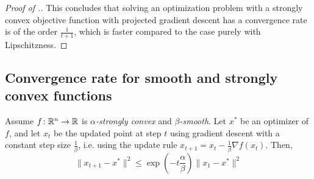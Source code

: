 \begin{proof}[Proof of .]
This concludes that solving an optimization problem with a strongly convex
objective function with projected gradient descent has a convergence rate is of
the order $\frac{1}{t+1}$, which is faster compared to the case purely with
Lipschitzness.
\end{proof}


\subsection{Convergence rate for smooth and strongly convex functions}

\begin{theorem} 
Assume $f\colon\mathbb{R}^n\to\mathbb{R}$ is \emph{$\alpha$-strongly convex} and
\emph{$\beta$-smooth}. Let $x^{*}$ be an optimizer of $f$, and let $x_{t}$ be
the updated point at step $t$ using gradient descent with a constant step size
$\frac{1}{\beta}$, i.e. using the update rule $x_{t+1} = x_t -
\frac{1}{\beta}\nabla f(x_t)$. Then,
\[
\|x_{t+1} - x^*\|^2 \leq \exp{(-t \frac{\alpha}{\beta})}\|x_1 - x^*\|^2
\]
\end{theorem}

